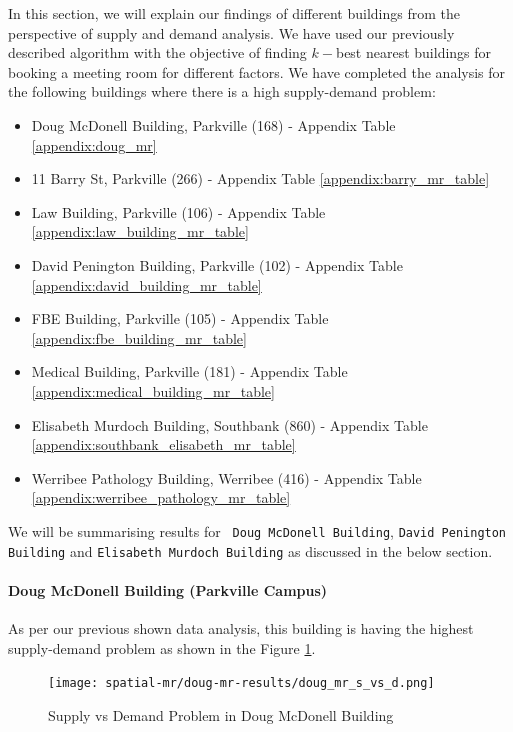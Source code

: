 In this section, we will explain our findings of different buildings from the perspective of supply and demand analysis. We have used our previously described algorithm with the objective of finding $k-$best nearest buildings for booking a meeting room for different factors. We have completed the analysis for the following buildings where there is a high supply-demand problem:
\begin{itemize}
    \item Doug McDonell Building, Parkville (168) - Appendix Table \ref{appendix:doug_mr}
    \item 11 Barry St, Parkville (266) - Appendix Table \ref{appendix:barry_mr_table}
    \item Law Building, Parkville (106) - Appendix Table \ref{appendix:law_building_mr_table}
    \item David Penington Building, Parkville (102) - Appendix Table \ref{appendix:david_building_mr_table}
    \item FBE Building, Parkville (105) - Appendix Table \ref{appendix:fbe_building_mr_table}
    \item Medical Building, Parkville (181) - Appendix Table \ref{appendix:medical_building_mr_table}
    \item Elisabeth Murdoch Building, Southbank (860) - Appendix Table \ref{appendix:southbank_elisabeth_mr_table}
    \item Werribee Pathology Building, Werribee (416) - Appendix Table \ref{appendix:werribee_pathology_mr_table}
\end{itemize}

We will be summarising results for \texttt{ Doug McDonell Building}, \texttt{David Penington Building} and \texttt{Elisabeth Murdoch Building} as discussed in the below section.


\paragraph{Doug McDonell Building (Parkville Campus)}

As per our previous shown data analysis, this building is having the highest supply-demand problem as shown in the Figure \ref{fig:doug_mr_s_vs_d}. 

\begin{figure}[H]
\centering
\texttt{[image: spatial-mr/doug-mr-results/doug\_mr\_s\_vs\_d.png]}
\caption{Supply vs Demand Problem in Doug McDonell Building}
\label{fig:doug_mr_s_vs_d}
\end{figure}

